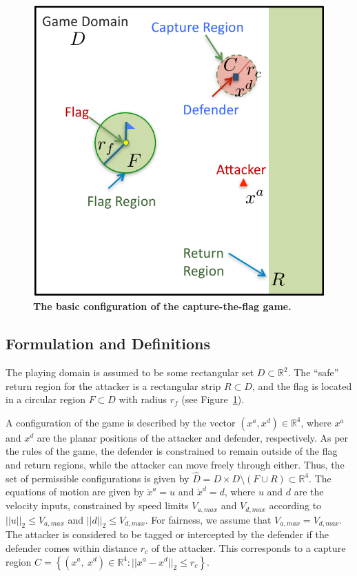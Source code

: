 \documentclass[letterpaper, 10 pt, conference]{ieeeconf}  %
\numberwithin{algorithm}{section}
\newcommand{\R}{\mathbb{R}}
\begin{document}
\begin{figure}[t]
	\centering
	\includegraphics[width=0.9\columnwidth]{figures/gameDiagram}
	\caption{\textbf{The basic configuration of the capture-the-flag game.}}
	\label{fig:gameDiagram}
\end{figure}

\subsection{Formulation and Definitions}

The playing domain is assumed to be some rectangular set $D \subset \R^2$.  The ``safe'' return region for the attacker is a rectangular strip $R \subset D$, and the flag is located in a circular region $F \subset D$ with radius $r_f$ (see Figure~\ref{fig:gameDiagram}).  

A configuration of the game is described by the vector $(x^a,x^d) \in \mathbb{R}^4$, where $x^a$ and $x^d$ are the planar positions of the attacker and defender, respectively.  As per the rules of the game, the defender is constrained to remain outside of the flag and return regions, while the attacker can move freely through either.  Thus, the set of permissible configurations is given by $\hat{D} = D \times D \setminus (F \cup R) \subset \R^4$.  The equations of motion are given by $\dot{x}^a = u$ and $\dot{x}^d = d$, where $u$ and $d$ are the velocity inputs, constrained by speed limits $V_{a,max}$ and $V_{d,max}$ according to  $|| u ||_2 \leq V_{a,max}$ and $|| d ||_2 \leq V_{d,max}$.  For fairness, we assume that $V_{a,max} = V_{d, max}$.   The attacker is considered to be tagged or intercepted by the defender if the defender comes within distance $r_c$ of the attacker.  This corresponds to a capture region $C = \left\{ (x^a,\ x^d) \in \mathbb{R}^4:  ||x^a - x^d||_2 \leq r_c\right\}$.
\end{document}
